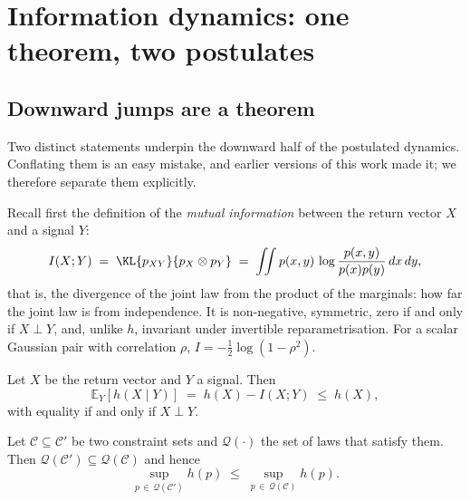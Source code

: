 
\section{Information dynamics: one theorem, two postulates}
\label{sec:dynamics}

\subsection{Downward jumps are a theorem}

Two distinct statements underpin the downward half of the postulated dynamics.
Conflating them is an easy mistake, and earlier versions of this work made it;
we therefore separate them explicitly.

Recall first the definition of the \emph{mutual information} between the return
vector $X$ and a signal $Y$:
\begin{equation}
\label{eq:mi}
I(X;Y) \;=\; \KL{p_{XY}}{p_X\otimes p_Y}
\;=\; \iint p(x,y)\,\log\frac{p(x,y)}{p(x)p(y)}\,dx\,dy ,
\end{equation}
that is, the divergence of the joint law from the product of the marginals: how
far the joint law is from independence. It is non-negative, symmetric, zero if
and only if $X\perp Y$, and, unlike $h$, invariant under invertible
reparametrisation. For a scalar Gaussian pair with correlation $\rho$,
$I=-\tfrac12\log(1-\rho^2)$.

\begin{proposition}
\label{prop:conditioning}
Let $X$ be the return vector and $Y$ a signal. Then
\begin{equation*}
\mathbb{E}_Y\!\left[h(X\mid Y)\right] \;=\; h(X) - I(X;Y) \;\le\; h(X),
\end{equation*}
with equality if and only if $X\perp Y$.
\end{proposition}

\begin{proposition}
\label{prop:constraint}
Let $\mathcal{C}\subseteq\mathcal{C}'$ be two constraint sets and
$\mathcal{Q}(\cdot)$ the set of laws that satisfy them. Then
$\mathcal{Q}(\mathcal{C}')\subseteq\mathcal{Q}(\mathcal{C})$ and hence
\begin{equation*}
\sup_{p\,\in\,\mathcal{Q}(\mathcal{C}')} h(p) \;\le\; \sup_{p\,\in\,\mathcal{Q}(\mathcal{C})} h(p).
\end{equation*}
\end{proposition}

